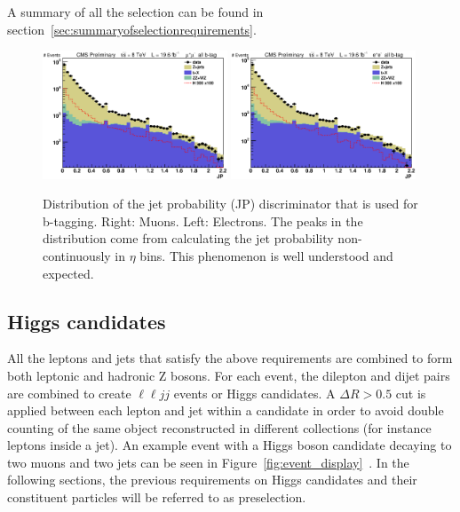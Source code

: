 A summary of all the selection can be found in section~\ref{sec:summaryofselectionrequirements}.


\begin{figure}[htb]
\begin{center}
\centerline{
\includegraphics[width=0.49\textwidth]{presentation/defense/images/preselection/mu/j0jp_log.eps}
\includegraphics[width=0.49\textwidth]{presentation/defense/images/preselection/el/j0jp_log.eps}
}
\caption{
Distribution of the jet probability (JP) discriminator that is used for b-tagging.  Right: Muons. Left: Electrons. The peaks in the distribution come from calculating the jet probability non-continuously in $\eta$ bins. This phenomenon is well understood and expected.
}
\label{fig:JP}
\end{center}
\end{figure}


\subsection{Higgs candidates}
\label{sec:reco}
All the leptons and jets that satisfy the above requirements are combined to form both leptonic and hadronic Z bosons.  For each event, the dilepton and dijet pairs are combined to create $\ell \ell jj$ events or Higgs candidates. A $\Delta R > 0.5$ cut is applied between each lepton and jet within a candidate in order to avoid double counting of the same object reconstructed in different collections (for instance leptons inside a jet). An example event with a Higgs boson candidate decaying to two muons and two jets can be seen in Figure~\ref{fig:event_display}~\cite{CMS-PAS-HIG-12-024}. In the following sections, the previous requirements on Higgs candidates and their constituent particles will be referred to as preselection.

